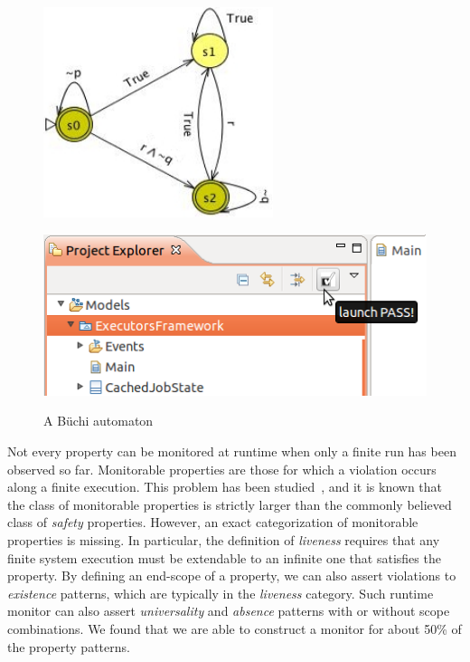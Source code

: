 \documentclass[letter]{llncs}
\begin{document}
\begin{figure}[!t]
 \centering
\begin{minipage}[!t]{0.5\linewidth}
\includegraphics[width=0.6\textwidth]{./Buchi2.jpg}%
\caption{A B\"uchi automaton}
\label{fig:Buchi}
\end{minipage}%
\begin{minipage}[t]{0.5\linewidth}
\includegraphics[width=1.0\textwidth]{./PASSlaunch.png}%
\label{fig:PASSlaunch}
%
\end{minipage}
\end{figure}

Not every property can be monitored at runtime when only a finite run has been 
observed so far. Monitorable properties are those for which a violation occurs along a finite execution.
This problem has been studied~\cite{DBLP:journals/corr/abs-1006-3638}, and it is known that the class of 
monitorable properties is strictly larger than the commonly believed class of \emph{safety} properties.
However, an exact categorization of monitorable properties is missing.
In particular, the definition of \emph{liveness} requires that any finite system
execution must be extendable to an infinite one that satisfies the property. 
By defining an end-scope of a property, we can also assert
violations to \emph{existence} patterns, which are typically in the \emph{liveness} category. 
Such runtime monitor can also assert \emph{universality} and \emph{absence} patterns 
with or without scope combinations. We found that we are able to construct 
a monitor for about 50\% of the property patterns.
\end{document}
